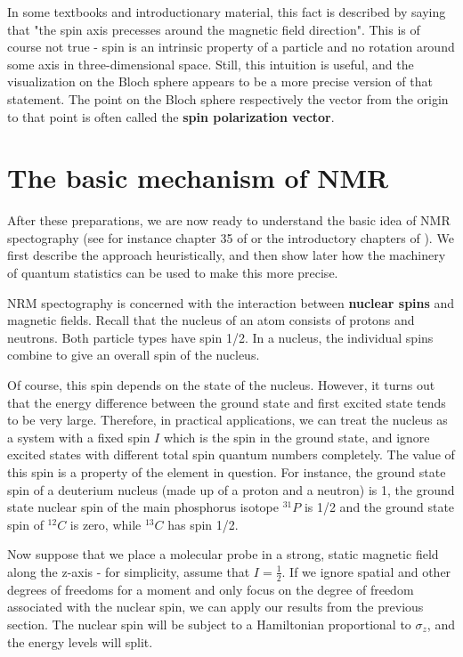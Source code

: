 \documentclass[a4paper, draft]{article}
\theoremstyle{own}
\theoremstyle{remark}
\begin{document}
In some textbooks and introductionary material, this fact is described by saying that "the spin axis precesses around the magnetic field direction". This is of course not true - spin is an intrinsic property of a particle and no rotation around some axis in three-dimensional space. Still, this intuition is useful, and the visualization on the Bloch sphere appears to be a more precise version of that statement. The point on the Bloch sphere respectively the vector from the origin to that point is often called the {\bf spin polarization vector}.

\section{The basic mechanism of NMR}

After these preparations, we are now ready to understand the basic idea of NMR spectography (see for instance chapter 35 of  \cite{FeynmanII} or the introductory chapters of \cite{Levitt}). We first describe the approach heuristically, and then show later how the machinery of quantum statistics can be used to make this more precise.

NRM spectography is concerned with the interaction between {\bf nuclear spins} and magnetic fields. Recall that the nucleus of an atom consists of protons and neutrons. Both particle types have spin 1/2. In a nucleus, the individual spins combine to give an overall spin of the nucleus.

Of course, this spin depends on the state of the nucleus. However, it turns out that the energy difference between the ground state and first excited state tends to be very large. Therefore, in practical applications, we can treat the nucleus as a system with a fixed spin $I$ which is the spin in the ground state, and ignore excited states with different total spin quantum numbers completely. The value of this spin is a property of the element in question. For instance, the ground state spin of a deuterium nucleus (made up of a proton and a neutron) is 1, the ground state nuclear spin of the main phosphorus isotope ${}^{31}P$ is 1/2 and the ground state spin of ${}^{12}C$ is zero, while ${}^{13}C$ has spin 1/2.

Now suppose that we place a molecular probe in a strong, static magnetic field along the z-axis - for simplicity, assume that $I = \frac{1}{2}$. If we ignore spatial and other degrees of freedoms for a moment and only focus on the degree of freedom associated with the nuclear spin, we can apply our results from the previous section. The nuclear spin will be subject to a Hamiltonian proportional to $\sigma_z$, and the energy levels will split. 
\end{document}
